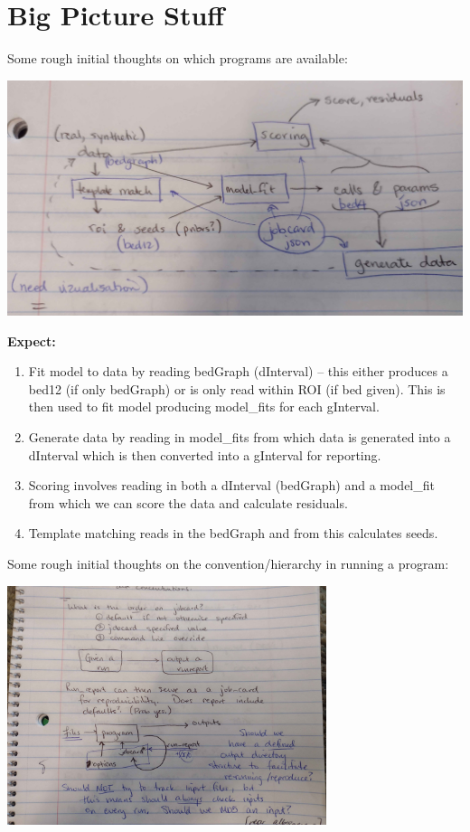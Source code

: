 \documentclass[11pt]{article}
\begin{document}
\section{Big Picture Stuff}
Some rough initial thoughts on which programs are available:

\includegraphics[width=\textwidth]{figs/ProgramsNotes.jpg}

\textbf{Expect:} 
\begin{enumerate}
\item Fit model to data by reading bedGraph (dInterval) -- this either
  produces a bed12 (if only bedGraph) or is only read within ROI (if bed given).  
  This is then used to fit model producing model\_fits for each gInterval.
\item Generate data by reading in model\_fits from which data is generated
    into a dInterval which is then converted into a gInterval for reporting.
\item Scoring involves reading in both a dInterval (bedGraph) and a model\_fit
  from which we can score the data and calculate residuals.
\item Template matching reads in the bedGraph and from this calculates seeds.
\end{enumerate}

Some rough initial thoughts on the convention/hierarchy in running a program:

\includegraphics[width=0.7\textwidth]{figs/RunNotes.jpg}
\end{document}
